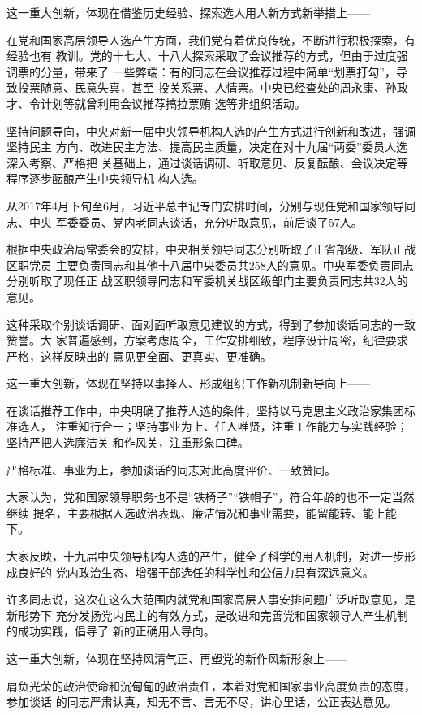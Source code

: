 \documentclass[11pt]{ctexart}
\begin{document}
{{{{这一重大创新，体现在借鉴历史经验、探索选人用人新方式新举措上——

在党和国家高层领导人选产生方面，我们党有着优良传统，不断进行积极探索，有经验也有
教训。党的十七大、十八大探索采取了会议推荐的方式，但由于过度强调票的分量，带来了
一些弊端：有的同志在会议推荐过程中简单“划票打勾”，导致投票随意、民意失真，甚至
投关系票、人情票。中央已经查处的周永康、孙政才、令计划等就曾利用会议推荐搞拉票贿
选等非组织活动。

坚持问题导向，中央对新一届中央领导机构人选的产生方式进行创新和改进，强调坚持民主
方向、改进民主方法、提高民主质量，决定在对十九届“两委”委员人选深入考察、严格把
关基础上，通过谈话调研、听取意见、反复酝酿、会议决定等程序逐步酝酿产生中央领导机
构人选。

从2017年4月下旬至6月，习近平总书记专门安排时间，分别与现任党和国家领导同志、中央
军委委员、党内老同志谈话，充分听取意见，前后谈了57人。

根据中央政治局常委会的安排，中央相关领导同志分别听取了正省部级、军队正战区职党员
主要负责同志和其他十八届中央委员共258人的意见。中央军委负责同志分别听取了现任正
战区职领导同志和军委机关战区级部门主要负责同志共32人的意见。

这种采取个别谈话调研、面对面听取意见建议的方式，得到了参加谈话同志的一致赞誉。大
家普遍感到，方案考虑周全，工作安排细致，程序设计周密，纪律要求严格，这样反映出的
意见更全面、更真实、更准确。

这一重大创新，体现在坚持以事择人、形成组织工作新机制新导向上——

在谈话推荐工作中，中央明确了推荐人选的条件，坚持以马克思主义政治家集团标准选人，
注重知行合一；坚持事业为上、任人唯贤，注重工作能力与实践经验；坚持严把人选廉洁关
和作风关，注重形象口碑。

严格标准、事业为上，参加谈话的同志对此高度评价、一致赞同。

大家认为，党和国家领导职务也不是“铁椅子”“铁帽子”，符合年龄的也不一定当然继续
提名，主要根据人选政治表现、廉洁情况和事业需要，能留能转、能上能下。

大家反映，十九届中央领导机构人选的产生，健全了科学的用人机制，对进一步形成良好的
党内政治生态、增强干部选任的科学性和公信力具有深远意义。

许多同志说，这次在这么大范围内就党和国家高层人事安排问题广泛听取意见，是新形势下
充分发扬党内民主的有效方式，是改进和完善党和国家领导人产生机制的成功实践，倡导了
新的正确用人导向。

这一重大创新，体现在坚持风清气正、再塑党的新作风新形象上——

肩负光荣的政治使命和沉甸甸的政治责任，本着对党和国家事业高度负责的态度，参加谈话
的同志严肃认真，知无不言、言无不尽，讲心里话，公正表达意见。

}}}}
\end{document}
